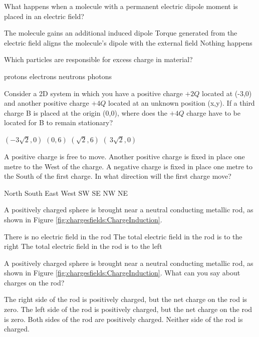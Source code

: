 \question What happens when a molecule with a permanent electric dipole moment is placed in an electric field?
\begin{checkboxes}
\choice The molecule gains an additional induced dipole
\CorrectChoice Torque generated from the electric field aligns the molecule's dipole with the external field \correct
\choice Nothing happens
\end{checkboxes}

\question Which particles are responsible for excess charge in material?
\begin{checkboxes}
\choice protons
\CorrectChoice electrons \correct
\choice neutrons
\choice photons
\end{checkboxes}


\question Consider a 2D system in which you have a positive charge $+2Q$ located at (-3,0) and another positive charge $+4Q$ located at an unknown position (x,y). If a third charge B is placed at the origin (0,0), where does the $+4Q$ charge have to be located for B to remain stationary?
\begin{checkboxes}
\choice $(-3 \sqrt{2},0)$
\choice $ (0, 6) $
\choice $(\sqrt{2}, 6 )$
\CorrectChoice $(\ 3 \sqrt{2},0)$ \correct
\end{checkboxes}  

\question A positive charge is free to move. Another positive charge is fixed in place one metre to the West of the charge. A negative charge is fixed in place one metre to the South of the first charge. In what direction will the first charge move?
\begin{checkboxes}
\choice North
\choice South
\choice East
\choice West
\choice SW
\CorrectChoice SE \correct
\choice NW
\choice NE
\end{checkboxes}  

\question A positively charged sphere is brought near a neutral conducting metallic rod, as shown in Figure \ref{fig:chargesfields:ChargeInduction}.
\begin{choices} 
\CorrectChoice There is no electric field in the rod \correct
\choice The total electric field in the rod is to the right
\choice The total electric field in the rod is to the left 
\end{choices}

\question A positively charged sphere is brought near a neutral conducting metallic rod, as shown in Figure \ref{fig:chargesfields:ChargeInduction}. What can you say about charges on the rod?
\begin{choices} 
\CorrectChoice The right side of the rod is positively charged, but the net charge on the rod is zero. \correct
\choice The left side of the rod is positively charged, but the net charge on the rod is zero.
\choice Both sides of the rod are positively charged.
\choice Neither side of the rod is charged.
\end{choices}

